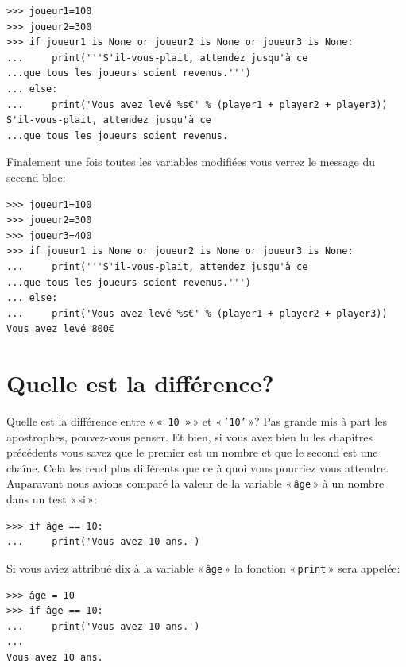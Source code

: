 \begin{Verbatim}[frame=single,rulecolor=\color{green}, label=à taper avec attention]
>>> joueur1=100
>>> joueur2=300
>>> if joueur1 is None or joueur2 is None or joueur3 is None:
...     print('''S'il-vous-plait, attendez jusqu'à ce 
...que tous les joueurs soient revenus.''')
... else:
...     print('Vous avez levé %s€' % (player1 + player2 + player3))
S'il-vous-plait, attendez jusqu'à ce 
...que tous les joueurs soient revenus.
\end{Verbatim}

Finalement une fois toutes les variables modifiées vous verrez le message du second bloc:

\begin{Verbatim}[frame=single,rulecolor=\color{green}, label=à taper avec attention]
>>> joueur1=100
>>> joueur2=300
>>> joueur3=400
>>> if joueur1 is None or joueur2 is None or joueur3 is None:
...     print('''S'il-vous-plait, attendez jusqu'à ce 
...que tous les joueurs soient revenus.''')
... else:
...     print('Vous avez levé %s€' % (player1 + player2 + player3))
Vous avez levé 800€
\end{Verbatim}

\section{Quelle est la différence?\label{sec:dif}}

Quelle est la différence entre « \texttt{« 10 »} » et « \texttt{'10'} »?
Pas grande mis à part les apostrophes, pouvez-vous penser. Et bien, si vous avez bien lu les chapitres précédents vous savez que le premier est un nombre et que le second est une chaîne. Cela les rend plus différents que ce à quoi vous pourriez vous attendre. Auparavant nous avions comparé la valeur de la variable « \texttt{âge} » à un nombre dans un test « si »:

\begin{Verbatim}[frame=single,rulecolor=\color{green}, label=à taper avec attention]
>>> if âge == 10:
...     print('Vous avez 10 ans.')
\end{Verbatim}

Si vous aviez attribué dix à la variable « \texttt{âge} »  la fonction « \texttt{print} »  sera appelée:

\begin{Verbatim}[frame=single,rulecolor=\color{green}, label=à taper avec attention]
>>> âge = 10
>>> if âge == 10:
...     print('Vous avez 10 ans.')
...
Vous avez 10 ans.
\end{Verbatim}

